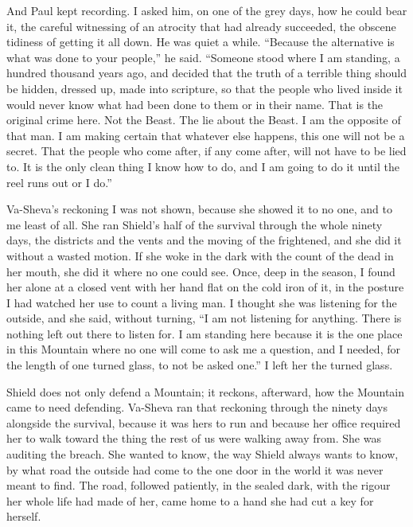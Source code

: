And Paul kept recording. I asked him, on one of the grey days, how he could bear it, the careful witnessing of an atrocity that had already succeeded, the obscene tidiness of getting it all down. He was quiet a while. ``Because the alternative is what was done to your people,'' he said. ``Someone stood where I am standing, a hundred thousand years ago, and decided that the truth of a terrible thing should be hidden, dressed up, made into scripture, so that the people who lived inside it would never know what had been done to them or in their name. That is the original crime here. Not the Beast. The lie about the Beast. I am the opposite of that man. I am making certain that whatever else happens, this one will not be a secret. That the people who come after, if any come after, will not have to be lied to. It is the only clean thing I know how to do, and I am going to do it until the reel runs out or I do.''\par

Va-Sheva's reckoning I was not shown, because she showed it to no one, and to me least of all. She ran Shield's half of the survival through the whole ninety days, the districts and the vents and the moving of the frightened, and she did it without a wasted motion. If she woke in the dark with the count of the dead in her mouth, she did it where no one could see. Once, deep in the season, I found her alone at a closed vent with her hand flat on the cold iron of it, in the posture I had watched her use to count a living man. I thought she was listening for the outside, and she said, without turning, ``I am not listening for anything. There is nothing left out there to listen for. I am standing here because it is the one place in this Mountain where no one will come to ask me a question, and I needed, for the length of one turned glass, to not be asked one.'' I left her the turned glass.\par

\ornament

Shield does not only defend a Mountain; it reckons, afterward, how the Mountain came to need defending. Va-Sheva ran that reckoning through the ninety days alongside the survival, because it was hers to run and because her office required her to walk toward the thing the rest of us were walking away from. She was auditing the breach. She wanted to know, the way Shield always wants to know, by what road the outside had come to the one door in the world it was never meant to find. The road, followed patiently, in the sealed dark, with the rigour her whole life had made of her, came home to a hand she had cut a key for herself.\par

